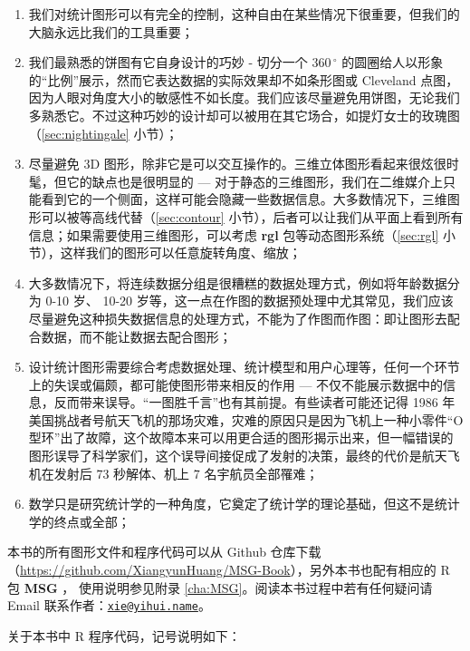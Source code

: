 \documentclass[
  b5paper,
  UTF8,twoside]{book}
\begin{document}
\begin{enumerate}
\def\labelenumi{\arabic{enumi}.}
\item
  我们对统计图形可以有完全的控制，这种自由在某些情况下很重要，但我们的大脑永远比我们的工具重要；
\item
  我们最熟悉的饼图有它自身设计的巧妙 - 切分一个 \(360\,^{\circ}\) 的圆圈给人以形象的``比例''展示，然而它表达数据的实际效果却不如条形图或 Cleveland 点图，因为人眼对角度大小的敏感性不如长度。我们应该尽量避免用饼图，无论我们多熟悉它。不过这种巧妙的设计却可以被用在其它场合，如提灯女士的玫瑰图（\ref{sec:nightingale} 小节）；
\item
  尽量避免 3D 图形，除非它是可以交互操作的。三维立体图形看起来很炫很时髦，但它的缺点也是很明显的 --- 对于静态的三维图形，我们在二维媒介上只能看到它的一个侧面，这样可能会隐藏一些数据信息。大多数情况下，三维图形可以被等高线代替（\ref{sec:contour} 小节），后者可以让我们从平面上看到所有信息；如果需要使用三维图形，可以考虑 \textbf{rgl} 包等动态图形系统（\ref{sec:rgl} 小节），这样我们的图形可以任意旋转角度、缩放；
\item
  大多数情况下，将连续数据分组是很糟糕的数据处理方式，例如将年龄数据分为 0-10 岁、 10-20 岁等，这一点在作图的数据预处理中尤其常见，我们应该尽量避免这种损失数据信息的处理方式，不能为了作图而作图：即让图形去配合数据，而不能让数据去配合图形；
\item
  设计统计图形需要综合考虑数据处理、统计模型和用户心理等，任何一个环节上的失误或偏颇，都可能使图形带来相反的作用 --- 不仅不能展示数据中的信息，反而带来误导。``一图胜千言''也有其前提。有些读者可能还记得 1986 年美国挑战者号航天飞机的那场灾难，灾难的原因只是因为飞机上一种小零件``O 型环''出了故障，这个故障本来可以用更合适的图形揭示出来，但一幅错误的图形误导了科学家们，这个误导间接促成了发射的决策，最终的代价是航天飞机在发射后 73 秒解体、机上 7 名宇航员全部罹难；
\item
  数学只是研究统计学的一种角度，它奠定了统计学的理论基础，但这不是统计学的终点或全部；
\end{enumerate}

本书的所有图形文件和程序代码可以从 Github 仓库下载（\url{https://github.com/XiangyunHuang/MSG-Book}），另外本书也配有相应的 R 包 \textbf{MSG} \citep{MSG}， 使用说明参见附录 \ref{cha:MSG}。阅读本书过程中若有任何疑问请 Email 联系作者：\href{mailto:xie@yihui.name}{\nolinkurl{xie@yihui.name}}。

关于本书中 R 程序代码，记号说明如下：
\end{document}
